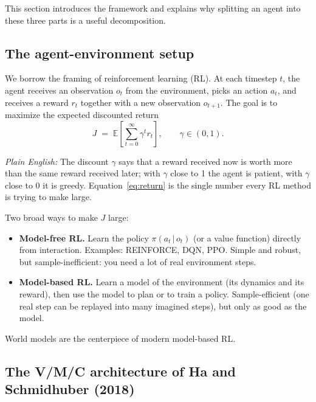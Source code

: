 \documentclass[11pt]{article}
\newcommand{\E}{\mathbb{E}}
\newcommand{\given}{\,\vert\,}
\theoremstyle{remark}
\newcommand{\plain}[1]{\medskip\noindent\textit{Plain English:} #1\medskip}
\begin{document}
This section introduces the framework and explains why splitting an agent into these three parts is a useful decomposition.

\subsection{The agent-environment setup}

We borrow the framing of reinforcement learning (RL). At each timestep $t$, the agent receives an observation $o_t$ from the environment, picks an action $a_t$, and receives a reward $r_t$ together with a new observation $o_{t+1}$. The goal is to maximize the expected discounted return
\begin{equation}
  J \;=\; \E\!\left[\sum_{t=0}^{\infty} \gamma^{t} r_t\right], \qquad \gamma \in (0,1).
  \label{eq:return}
\end{equation}

\plain{The discount $\gamma$ says that a reward received now is worth more than the same reward received later; with $\gamma$ close to 1 the agent is patient, with $\gamma$ close to 0 it is greedy. Equation~\eqref{eq:return} is the single number every RL method is trying to make large.}

Two broad ways to make $J$ large:

\begin{itemize}[leftmargin=1.4em]
  \item \textbf{Model-free RL.} Learn the policy $\pi(a_t \given o_t)$ (or a value function) directly from interaction. Examples: REINFORCE, DQN, PPO. Simple and robust, but sample-inefficient: you need a lot of real environment steps.
  \item \textbf{Model-based RL.} Learn a model of the environment (its dynamics and its reward), then use the model to plan or to train a policy. Sample-efficient (one real step can be replayed into many imagined steps), but only as good as the model.
\end{itemize}

World models are the centerpiece of modern model-based RL.

\subsection{The V/M/C architecture of Ha and Schmidhuber (2018)}
\end{document}
